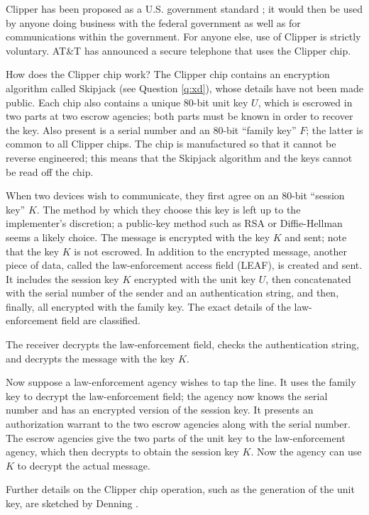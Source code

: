 Clipper has been proposed as a U.S. government standard \cite{nist-ees}; 
it would then be used by anyone doing business with the federal government 
as well as for communications within the government. For anyone else, use 
of Clipper is strictly voluntary. AT\&T has announced a secure telephone 
that uses the Clipper chip.

{How does the Clipper chip work?}
The Clipper chip contains an encryption algorithm called Skipjack (see
Question \ref{q:xd}), whose details have not been made public. Each chip 
also contains a unique 80-bit unit key $U$, which is escrowed in two parts 
at two escrow agencies; both parts must be known in order to recover the 
key. Also present is a serial number and an 80-bit ``family key'' $F$; the 
latter is common to all Clipper chips. The chip is manufactured so that it 
cannot be reverse engineered; this means that the Skipjack algorithm and 
the keys cannot be read off the chip.

When two devices wish to communicate, they first agree on an 80-bit
``session key'' $K$. The method by which they choose this key is left
up to the implementer's discretion; a public-key method such as RSA or
Diffie-Hellman seems a likely choice. The message is encrypted with
the key $K$ and sent; note that the key $K$ is not escrowed. In addition 
to the encrypted message, another piece of data, called the law-enforcement 
access field (LEAF), is created and sent. It includes the session key $K$ 
encrypted with the unit key $U$, then concatenated with the serial number 
of the sender and an authentication string, and then, finally, all encrypted 
with the family key. The exact details of the law-enforcement field are 
classified.

The receiver decrypts the law-enforcement field, checks the authentication
string, and decrypts the message with the key $K$. 

Now suppose a law-enforcement agency wishes to tap the line. It uses the
family key to decrypt the law-enforcement field; the agency now knows the
serial number and has an encrypted version of the session key. It presents
an authorization warrant to the two escrow agencies along with the serial
number. The escrow agencies give the two parts of the unit key to the
law-enforcement agency, which then decrypts to obtain the session key $K$.
Now the agency can use $K$ to decrypt the actual message.

Further details on the Clipper chip operation, such as the generation
of the unit key, are sketched by Denning \cite{denning-clipper2}.

